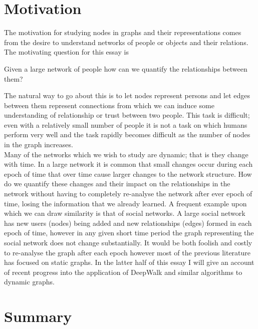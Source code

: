 \documentclass[a4paper]{article}
\begin{document}


\tableofcontents

\section{Motivation}
The motivation for studying nodes in graphs and their representations comes from the desire to understand networks of people or objects and their relations. The motivating question for this essay is
\begin{question}
  Given a large network of people how can we quantify the relationships between them?
\end{question}
The natural way to go about this is to let nodes represent persons and let edges
between them represent connections from which we can induce some understanding
of relationship or trust between two people. This task is difficult; even with a
relatively small number of people it is not a task on which humans perform very
well and the task rapidly becomes difficult as the number of nodes in the graph increases.\\
Many of the networks which we wish to study are dynamic; that is they change
with time. In a large network it is common that small changes occur during each
epoch of time that over time cause larger changes to the network structure. How
do we quantify these changes and their impact on the relationships in the
network without having to completely re-analyse the network after ever epoch of
time, losing the information that we already learned. A frequent example upon
which we can draw similarity is that of social networks. A large social network
has new users (nodes) being added and new relationships (edges) formed in each
epoch of time, however in any given short time period the graph representing the
social network does not change substantially. It would be both foolish and
costly to re-analyse the graph after each epoch however most of the previous
literature has focused on static graphs. In the latter half of this essay I will
give an account of recent progress into the application of DeepWalk and similar
algorithms to dynamic graphs.

\section{Summary}
\end{document}
